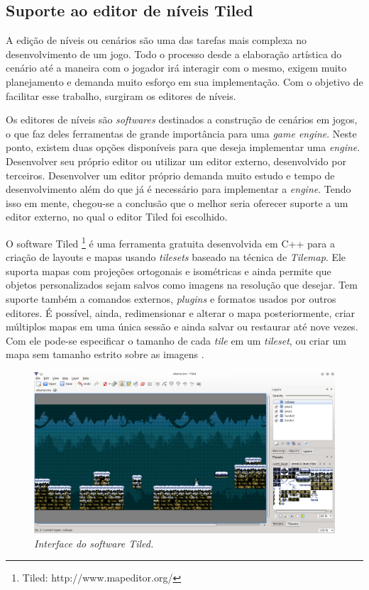 \subsection{Suporte ao editor de níveis Tiled}
%
A edição de níveis ou cenários são uma das tarefas mais complexa no desenvolvimento de um jogo. Todo o processo desde a elaboração artística do cenário até a maneira com o jogador irá interagir com o mesmo, exigem muito planejamento e demanda muito esforço em sua implementação. Com o objetivo de facilitar esse trabalho, surgiram os editores de níveis. 
\par
Os editores de níveis são \textit{softwares} destinados a construção de cenários em jogos, o que faz deles ferramentas de grande importância para uma \textit{game engine}. Neste ponto, existem duas opções disponíveis para que deseja implementar uma \textit{engine}. Desenvolver seu próprio editor ou utilizar um editor externo, desenvolvido por terceiros. Desenvolver um editor próprio demanda muito estudo e tempo de desenvolvimento além do que já é necessário para implementar a \textit{engine}. Tendo isso em mente, chegou-se a conclusão que o melhor seria oferecer suporte a um editor externo, no qual o editor Tiled foi escolhido. 
\par
O software Tiled \footnote{Tiled: http://www.mapeditor.org/} é uma ferramenta gratuita desenvolvida em C++ para a criação de layouts e mapas usando \textit{tilesets} baseado na técnica de \textit{Tilemap}. Ele suporta mapas com projeções ortogonais e isométricas e ainda permite que 
objetos personalizados sejam salvos como imagens na resolução que desejar. Tem suporte também a comandos externos, 
\textit{plugins} e formatos usados por outros editores. É possível, ainda, redimensionar e alterar o mapa posteriormente, criar múltiplos mapas em uma única sessão e ainda salvar ou restaurar até nove vezes. Com ele pode-se especificar o tamanho de cada \textit{tile} em um \textit{tileset}, ou criar um mapa sem tamanho estrito sobre as imagens \cite{TiledTutorial}.
%
\begin{figure}[H]
    \centering
    \includegraphics[scale = 0.45]{Imagens/Tiled.png}
    \caption{\textit{Interface do \textit{software} Tiled.}}
    \label{tiled_interface}
\end{figure}
